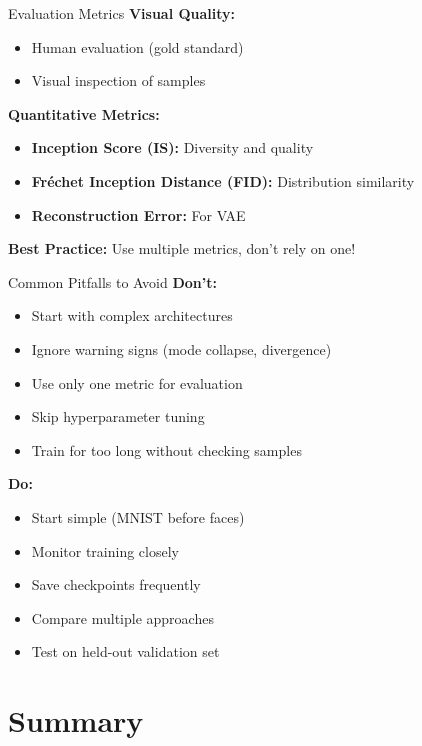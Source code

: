 \documentclass[aspectratio=169,10pt]{beamer}
\begin{document}
\begin{frame}{Evaluation Metrics}
\textbf{Visual Quality:}
\begin{itemize}
\item Human evaluation (gold standard)
\item Visual inspection of samples
\end{itemize}

\textbf{Quantitative Metrics:}
\begin{itemize}
\item \textbf{Inception Score (IS):} Diversity and quality
\item \textbf{Fréchet Inception Distance (FID):} Distribution similarity
\item \textbf{Reconstruction Error:} For VAE
\end{itemize}

\textbf{Best Practice:} Use multiple metrics, don't rely on one!
\end{frame}

\begin{frame}{Common Pitfalls to Avoid}
\textbf{Don't:}
\begin{itemize}
\item Start with complex architectures
\item Ignore warning signs (mode collapse, divergence)
\item Use only one metric for evaluation
\item Skip hyperparameter tuning
\item Train for too long without checking samples
\end{itemize}

\textbf{Do:}
\begin{itemize}
\item Start simple (MNIST before faces)
\item Monitor training closely
\item Save checkpoints frequently
\item Compare multiple approaches
\item Test on held-out validation set
\end{itemize}
\end{frame}

\section{Summary}
\end{document}
